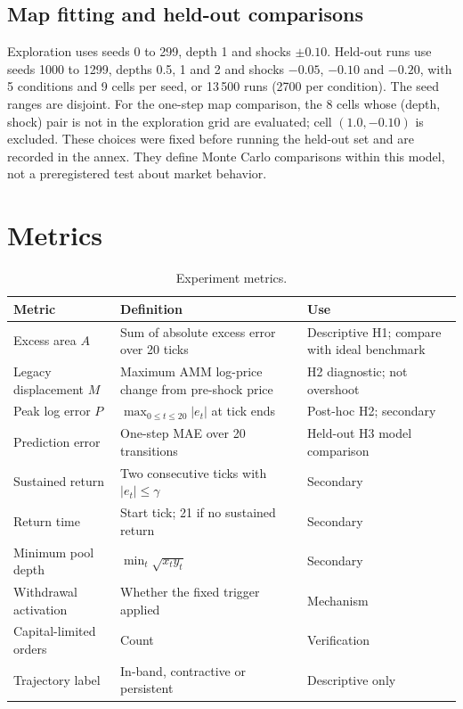 \subsection{Map fitting and held-out comparisons}

Exploration uses seeds 0 to 299, depth 1 and shocks $\pm0.10$. Held-out runs use seeds 1000 to 1299, depths 0.5, 1 and 2 and shocks $-0.05$, $-0.10$ and $-0.20$, with 5 conditions and 9 cells per seed, or 13\,500 runs (2700 per condition). The seed ranges are disjoint. For the one-step map comparison, the 8 cells whose (depth, shock) pair is not in the exploration grid are evaluated; cell $(1.0,-0.10)$ is excluded. These choices were fixed before running the held-out set and are recorded in the annex. They define Monte Carlo comparisons within this model, not a preregistered test about market behavior.

\section{Metrics}

\begin{table}[htbp]
\centering
\caption{Experiment metrics.}
\label{tab:metricas}
\small
\begin{tabularx}{\textwidth}{@{}l >{\raggedright\arraybackslash}X l@{}}
\toprule
Metric & Definition & Use \\
\midrule
Excess area $A$ & Sum of absolute excess error over 20 ticks & Descriptive H1; compare with ideal benchmark \\
Legacy displacement $M$ & Maximum AMM log-price change from pre-shock price & H2 diagnostic; not overshoot \\
Peak log error $P$ & $\max_{0\le t\le20}|e_t|$ at tick ends & Post-hoc H2; secondary \\
Prediction error & One-step MAE over 20 transitions & Held-out H3 model comparison \\
Sustained return & Two consecutive ticks with $|e_t|\le\gamma$ & Secondary \\
Return time & Start tick; 21 if no sustained return & Secondary \\
Minimum pool depth & $\min_t\sqrt{x_ty_t}$ & Secondary \\
Withdrawal activation & Whether the fixed trigger applied & Mechanism \\
Capital-limited orders & Count & Verification \\
Trajectory label & In-band, contractive or persistent & Descriptive only \\
\bottomrule
\end{tabularx}
\end{table}

